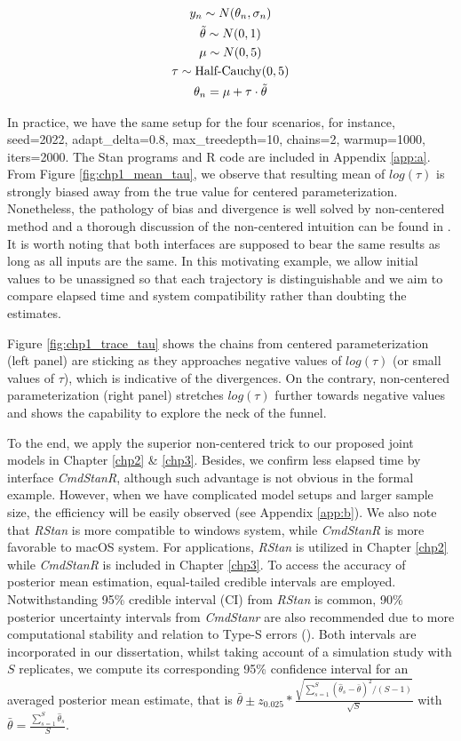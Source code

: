 \begin{gather*} 
    y_n \sim N(\theta_n, \sigma_n)\\
    \Tilde{\theta} \sim N(0,1)\\
    \mu \sim N(0,5) \\
    \tau \sim \mbox{Half-Cauchy}(0,5)\\
    \theta_n = \mu + \tau \cdot \Tilde{\theta}
\end{gather*}

In practice, we have the same setup for the four scenarios, for instance, seed=2022, adapt\_delta=0.8, max\_treedepth=10, chains=2, warmup=1000, iters=2000. The Stan programs and R code are included in Appendix \ref{app:a}. From Figure \ref{fig:chp1_mean_tau}, we observe that resulting mean of $log(\tau)$ is strongly biased away from the true value for centered parameterization. Nonetheless, the pathology of bias and divergence is well solved by non-centered method and a thorough discussion of the non-centered intuition can be found in \cite{Betancourt2015}. It is worth noting that both interfaces are supposed to bear the same results as long as all inputs are the same. In this motivating example, we allow initial values to be unassigned so that each trajectory is distinguishable and we aim to compare elapsed time and system compatibility rather than doubting the estimates. 

Figure \ref{fig:chp1_trace_tau} shows the chains from centered parameterization (left panel) are sticking as they approaches negative values of $log(\tau)$ (or small values of $\tau$), which is indicative of the divergences. On the contrary, non-centered parameterization (right panel) stretches $log(\tau)$ further towards negative values and shows the capability to explore the neck of the funnel.

To the end, we apply the superior non-centered trick to our proposed joint models in Chapter \ref{chp2} \& \ref{chp3}. Besides, we confirm less elapsed time by interface \emph{CmdStanR}, although such advantage is not obvious in the formal example. However, when we have complicated model setups and larger sample size, the efficiency will be easily observed (see Appendix \ref{app:b}). We also note that \emph{RStan} is more compatible to windows system, while \emph{CmdStanR} is more favorable to macOS system. For applications, \emph{RStan} is utilized in Chapter \ref{chp2} while \emph{CmdStanR} is included in Chapter \ref{chp3}. To access the accuracy of posterior mean estimation, equal-tailed credible intervals are employed. Notwithstanding 95\% credible interval (CI) from \emph{RStan} is common, 90\% posterior uncertainty intervals from \emph{CmdStanr} are also recommended due to more computational stability and relation to Type-S errors (\cite{Gelman2014b}). Both intervals are incorporated in our dissertation, whilst taking account of a simulation study with $S$ replicates, we compute its corresponding 95\% confidence interval for an averaged posterior mean estimate, that is $\bar{\theta} \pm z_{0.025} * \frac{\sqrt{\sum_{s=1}^{S}(\hat{\theta}_s-\bar{\theta})^2/(S-1)}}{\sqrt{S}}$ with $\bar{\theta}=\frac{\sum_{s=1}^{S}\hat{\theta}_s}{S}$.  

